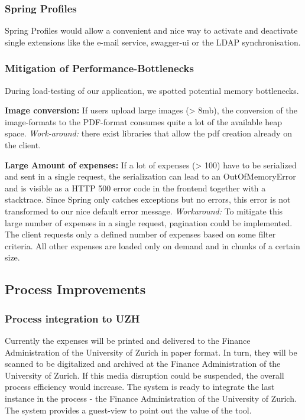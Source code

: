\subsubsection{Spring Profiles}
Spring Profiles would allow a convenient and nice way to activate and deactivate single extensions like the e-mail service, swagger-ui or the LDAP synchronisation.

\subsubsection{Mitigation of Performance-Bottlenecks}
During load-testing of our application, we spotted potential memory bottlenecks.\par 

\textbf{Image conversion:} If users upload large images (> 8mb), the conversion of the image-formats to the PDF-format consumes quite a lot of the available heap space. \textit{Work-around:} there exist libraries that allow the pdf creation already on the client.\par 
 	
\textbf{Large Amount of expenses:} If a lot of expenses (> 100) have to be serialized and sent in a single request, the serialization can lead to an OutOfMemoryError and is visible as a HTTP 500 error code in the frontend together with a stacktrace. Since Spring only catches exceptions but no errors, this error is not transformed to our nice default error message. \textit{Workaround: } To mitigate this large number of expenses in a single request, pagination could be implemented. The client requests only a defined number of expenses based on some filter criteria. All other expenses are loaded only on demand and in chunks of a certain size.


\subsection{Process Improvements}
\label{sec:process-improvements}
\subsubsection{Process integration to UZH}
Currently the expenses will be printed and delivered to the Finance Administration of the University of Zurich in paper format. In turn, they will be scanned to be digitalized and archived at the Finance Administration of the University of Zurich. If this media disruption could be suspended, the overall process efficiency would increase. The system is ready to integrate the last instance in the process - the Finance Administration of the University of Zurich. The system provides a guest-view to point out the value of the tool.\par

